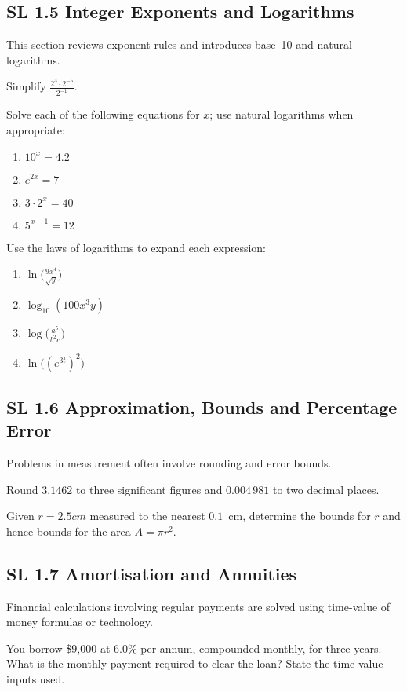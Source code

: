 \documentclass[11pt]{article}
\def\SI#1#2{#1 #2}%
\newcommand{\tocsubsection}[1]{\subsection{#1}}
\newcounter{question}
\begin{document}
\tocsubsection{SL  1.5  \; Integer  Exponents  and  Logarithms}
This section reviews exponent rules and introduces base 10 and natural
logarithms.

\begin{question}
Simplify $\displaystyle\frac{2^3\cdot2^{-5}}{2^{-1}}$.
\end{question}

\begin{question}
Solve each of the following equations for $x$; use natural logarithms when
appropriate:
\begin{enumerate}[label=\alph*)]
\item $10^{x}=4.2$
\item $e^{2x}=7$
\item $3\cdot 2^{x}=40$
\item $5^{x-1}=12$
\end{enumerate}
\end{question}

\begin{question}
Use the laws of logarithms to expand each expression:
\begin{enumerate}[label=\alph*)]
\item $\ln\!\bigl(\tfrac{9x^4}{\sqrt{y}}\bigr)$
\item $\log_{10}(100x^3y)$
\item $\log\!\bigl(\tfrac{a^5}{b^2c}\bigr)$
\item $\ln\!\bigl((e^{3t})^2\bigr)$
\end{enumerate}
\end{question}

\tocsubsection{SL  1.6  \; Approximation,  Bounds  and  Percentage  Error}
Problems in measurement often involve rounding and error bounds.

\begin{question}
Round $3.1462$ to three significant figures and $0.004\,981$ to two decimal
places.
\end{question}

\begin{question}
Given $r=\SI{2.5}{cm}$ measured to the nearest $0.1$ cm, determine the bounds
for $r$ and hence bounds for the area $A=\pi r^2$.
\end{question}

\tocsubsection{SL  1.7  \; Amortisation  and  Annuities}
Financial calculations involving regular payments are solved using time-value
of money formulas or technology.

\begin{question}
You borrow \$9{,}000 at $6.0\%$ per annum, compounded monthly, for three years.
What is the monthly payment required to clear the loan?  State the time-value
inputs used.
\end{question}
\end{document}
